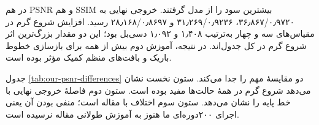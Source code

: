 در  هم PSNR و هم SSIM بیشترین سود را از مدل گرفتند. خروجی نهایی به ۳۶٫۸۶۷/۰٫۹۷۲۰، ۳۱٫۲۶۹/۰٫۹۲۳۶ و ۲۸٫۱۶۸/۰٫۸۶۹۷ رسید. افزایش شروع گرم در مقیاس‌های سه و چهار به‌ترتیب ۱٫۴۰۸ و ۱٫۰۹۲ دسی‌بل بود؛ این دو مقدار بزرگ‌ترین اثر شروع گرم در کل جدول‌اند. در نتیجه، آموزش دوم بیش از همه برای بازسازی خطوط باریک و بافت‌های منظم کمیک مؤثر بوده است.

جدول \ref{tab:our-psnr-differences} دو مقایسهٔ مهم را جدا می‌کند. ستون نخست نشان می‌دهد شروع گرم در همهٔ حالت‌ها مفید بوده است. ستون دوم فاصلهٔ خروجی نهایی با خط پایه را نشان می‌دهد. ستون سوم اختلاف با مقاله است؛ منفی بودن آن یعنی اجرای ۲۰۰‌دوره‌ای ما هنوز به آموزش طولانی مقاله نرسیده است.

\begin{table}[H]
\centering
\caption{اختلاف PSNR خروجی نهایی برحسب دسی‌بل؛ «مرحلهٔ اول» خروجی ۱۰۰‌دوره‌ای پیش از شروع گرم است}
\label{tab:our-psnr-differences}
\end{table}

